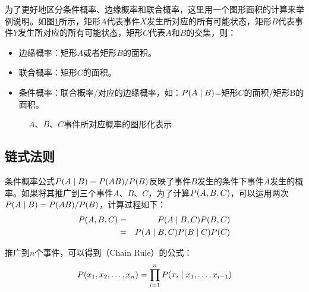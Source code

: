 \parinterval 为了更好地区分条件概率、边缘概率和联合概率，这里用一个图形面积的计算来举例说明。如图\ref{fig:2-2}所示，矩形$A$代表事件$X$发生所对应的所有可能状态，矩形$B$代表事件$Y$发生所对应的所有可能状态，矩形$C$代表$A$和$B$的交集，则：

\begin{itemize}
\vspace{0.5em}
\item 边缘概率：矩形$A$或者矩形$B$的面积。
\vspace{0.5em}
\item 联合概率：矩形$C$的面积。
\vspace{0.5em}
\item 条件概率：联合概率/对应的边缘概率，如：${P}(A \mid B)$=矩形$C$的面积/矩形B的面积。
\vspace{0.5em}
\end{itemize}

\begin{figure}[htp]
\centering

\caption{$A$、$B$、$C$事件所对应概率的图形化表示}
\label{fig:2-2}
\end{figure}


\subsection{链式法则} \label{sec:chain-rule}

\parinterval 条件概率公式${P}(A \mid B)={P}(AB)/{P}(B)$反映了事件$B$发生的条件下事件$A$发生的概率。如果将其推广到三个事件$A$、$B$、$C$，为了计算${P}(A,B,C)$，可以运用两次${P}(A \mid B)={P}(AB)/{P}(B)$，计算过程如下：
\begin{eqnarray}
{P}(A,B,C) & = & {P}(A \mid B ,C){P}(B,C) \nonumber \\
                           & = & {P}(A \mid B,C){P}(B \mid C){P}(C)
\label{eq:2-5}
\end{eqnarray}

\parinterval 推广到$n$个事件，可以得到{\small{}}（Chain Rule）的公式：
\begin{eqnarray}
{P}(x_1,x_2, \ldots ,x_n)=\prod_{i=1}^n {P}(x_i \mid x_1, \ldots ,x_{i-1})
\label{eq:2-6}
\end{eqnarray}

